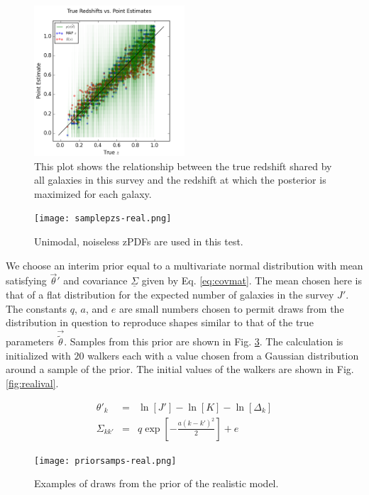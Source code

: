 \documentclass[preprint]{aastex}
\newcommand{\textul}{\underline}
\begin{document}
\begin{figure}
\includegraphics[width=0.5\textwidth]{truevmap-real.png}
\caption{This plot shows the relationship between the true redshift shared by all galaxies in this survey and the redshift at which the posterior is maximized for each galaxy.}
\label{fig:realcat}
\end{figure}

\begin{figure}
\texttt{[image: samplepzs-real.png]}
\caption{Unimodal, noiseless zPDFs are used in this test.}
\label{fig:realpzs}
\end{figure}

We choose an interim prior equal to a multivariate normal distribution with mean satisfying $\vec{\theta}'$ and covariance $\textul{\Sigma}$ given by Eq. \ref{eq:covmat}.  The mean chosen here is that of a flat distribution for the expected number of galaxies in the survey $J'$.  The constants $q$, $a$, and $e$ are small numbers chosen to permit draws from the distribution in question to reproduce shapes similar to that of the true parameters $\vec{\tilde{\theta}}$.  Samples from this prior are shown in Fig. \ref{fig:realprior}.  The calculation is initialized with $20$ walkers each with a value chosen from a Gaussian distribution around a sample of the prior.  The initial values of the walkers are shown in Fig. \ref{fig:realival}.

\begin{eqnarray}
\label{eq:covmat}
\theta'_{k} &=& \ln[J']-\ln[K]-\ln[\Delta_{k}]\\
\Sigma_{kk'} &=& q\exp\left[-\frac{a(k-k')^{2}}{2}\right]+e
\end{eqnarray}

\begin{figure}
\texttt{[image: priorsamps-real.png]}
\caption{Examples of draws from the prior of the realistic model.}
\label{fig:realprior}
\end{figure}
\end{document}
